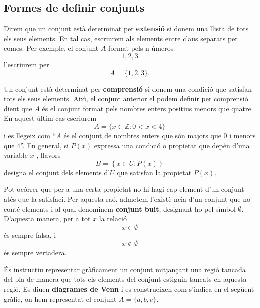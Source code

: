 \subsection{Formes de definir conjunts}

Direm que un conjunt est\`{a} determinat per \textbf{extensi\'{o}} si donem
una llista de tots els seus elements. En tal cas, escriurem als elements
entre claus separats per comes. Per exemple, el conjunt $A$ format pels n%
\'{u}meros%
\begin{equation*}
1,2,3
\end{equation*}
l'escriurem per%
\begin{equation*}
A=\{1,2,3\}\text{.}
\end{equation*}

\bigskip

Un conjunt est\`{a} determinat per \textbf{comprensi\'{o}} si donem una
condici\'{o} que satisfan tots els seus elements. Aix\'{\i}, el conjunt
anterior el podem definir per comprensi\'{o} dient que $A$ \'{e}s el conjunt
format pels nombres enters positius menors que quatre. En aquest \'{u}ltim
cas escriurem%
\begin{equation*}
A=\{x\in\mathbb{Z}:0<x<4\}
\end{equation*}
i es llegeix com \textquotedblleft$A$ \'{e}s el conjunt de nombres enters
que s\'{o}n majors que 0 i menors que $4$\textquotedblright. En general, si $%
P(x)$ expressa una condici\'{o} o propietat que dep\`{e}n d'una variable $x$%
, llavors%
\begin{equation*}
B=\left\{ x\in U:P(x)\right\}
\end{equation*}
designa el conjunt dels elements d'$U$ que satisfan la propietat $P(x)$.

\bigskip

Pot oc\'{o}rrer que per a una certa propietat no hi hagi cap element d'un
conjunt at\`{e}s que la satisfaci. Per aquesta ra\'{o}, admetem l'exist\`{e}%
ncia d'un conjunt que no cont\'{e} elements i al qual denominem \textbf{%
conjunt buit}, designant-ho pel s\'{\i}mbol $\emptyset$. D'aquesta manera,
per a tot $x$ la relaci\'{o}%
\begin{equation*}
x\in\emptyset
\end{equation*}
\'{e}s sempre falsa, i%
\begin{equation*}
x\notin\emptyset
\end{equation*}
\'{e}s sempre vertadera.

\bigskip

\'{E}s instructiu representar gr\`{a}ficament un conjunt mitjan\c{c}ant una
regi\'{o} tancada del pla de manera que tots els elements del conjunt
estiguin tancats en aquesta regi\'{o}. Es diuen \textbf{diagrames de Venn} i
es construeixen com s'indica en el seg\"{u}ent gr\`{a}fic, on hem
representat el conjunt $A=\{a,b,e\}$.

